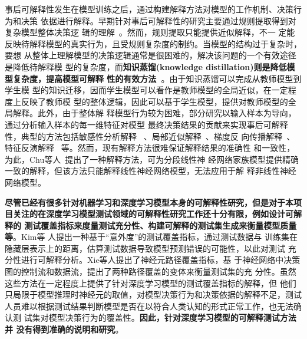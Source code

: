 事后可解释性发生在模型训练之后，通过构建解释方法对模型的工作机制、决策行为和决策
依据进行解释。早期针对事后可解释性的研究主要通过规则提取得到对复杂模型整体决策逻
辑的理解~。然而，规则提取只能提供近似解释，不一
定能反映待解释模型的真实行为，且受规则复杂度的制约。当模型的结构过于复杂时，要想
从整体上理解模型的决策逻辑通常是很困难的，解决该问题的一个有效途径是降低待解释模
型的复杂度，而\textbf{知识蒸馏(knowledge distillation)则是降低模型复杂度，提高模型可解释
	性的有效方法~}。{由于知识蒸馏可以完成从教师模型到学生模
型的知识迁移，因而学生模型可以看作是教师模型的全局近似，在一定程度上反映了教师模
型的整体逻辑，因此可以基于学生模型，提供对教师模型的全局解释}。此外，由于整体解
释模型行为较为困难，部分研究以输入样本为导向，通过分析输入样本的每一维特征对模型
最终决策结果的贡献来实现事后可解释性，典型的方法包括敏感性分析解释
~、局部近似解释~、梯度反
向传播解释~、特征反演解释
~等。然而，现有解释方法很难保证解释结果的准确性
和一致性，为此，Chu等人~提出了一种解释方法，可为分段线性神
经网络家族模型提供精确一致的解释，但该方法只能解释线性神经网络模型，无法应用于解
释非线性神经网络模型。

\textbf{尽管已经有很多针对机器学习和深度学习模型本身的可解释性研究，但是对于本项
	目关注的在深度学习模型测试领域的可解释性研究工作还十分有限，例如设计可解释的
	测试覆盖指标来度量测试充分性、构建可解释的测试集生成来衡量模型质量等}。Kim等
	人提出一种基于“意外度”的测试覆盖指标，通过测试数据与
	训练集在隐藏层表示上的距离，估算测试数据导致模型预测错误的可能性，以此对测试
	充分性进行可解释分析。Xie等人提出了神经元路径覆盖指标，基
	于神经网络中决策图的控制流和数据流，提出了两种路径覆盖的变体来衡量测试集的充
	分性。虽然这些方法在一定程度上提供了针对深度学习模型的测试覆盖指标的解释，但
	他们只局限于模型推理时神经元的取值，对模型决策行为和决策依据的解释不足，测试
	人员难以根据测试结果判断模型是否在以符合人类认知的形式正常工作，也无法确认测
	试集对模型决策行为的覆盖性。\textbf{因此，针对深度学习模型的可解释测试方法并
	没有得到准确的说明和研究}。

\iffalse
	\textbf{尽管已经有很多针对机器学习和深度学习模型本身的可解释性研究，但是对于本项
		目关注的针对深度学习系统测试方面的可解释性研究工作还十分有限。}Kim等人
	\citess{Kim2019Guiding}提出一种基于“意外度”的测试覆盖指标，通过度量测试数据与训
	练集的不同距离，评估测试集对样本输入空间的覆盖度，从而对测试目标进行一定的可解释
	性分析。Xie等人\citess{Xie2021NPC}提出了神经元路径覆盖指标，类似于传统的程序控制
	流图，首先从深度神经网络中提取决策图用来表示模型的决策逻辑，然后基于决策图的控制
	流和数据流，该方法提出了两种路径覆盖的变体来衡量测试数据在执行决策逻辑时的充分
	性。该测试方法在一定程度上反映出模型的决策逻辑，但由于模型本身缺乏可解释性，难以
	从控制流或数据流路径上辅助开发人员找到模型失效的原因，从而帮助修复模型。但是该方
	法依赖于模型推理过程中的神经元取值，缺乏对模型决策行为的解释，难以检查模型是否在
	以符合人类认知的形式正常工作。
\fi

